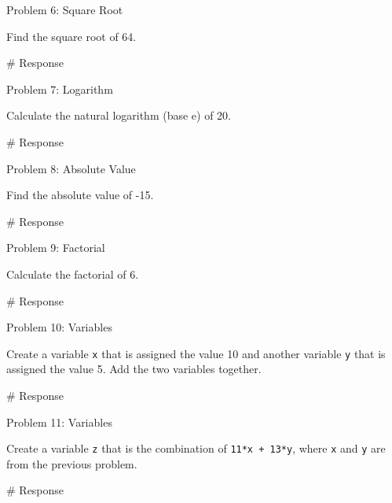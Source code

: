 \documentclass[
  letterpaper,
  DIV=11,
  numbers=noendperiod]{scrreprt}
\newenvironment{Shaded}{\begin{snugshade}}{\end{snugshade}}
\newcommand{\CommentTok}[1]{\textcolor[rgb]{0.37,0.37,0.37}{#1}}
\begin{document}
Problem 6: Square Root

Find the square root of 64.

\begin{Shaded}
\begin{Highlighting}[]
\CommentTok{\# Response}
\end{Highlighting}
\end{Shaded}

Problem 7: Logarithm

Calculate the natural logarithm (base e) of 20.

\begin{Shaded}
\begin{Highlighting}[]
\CommentTok{\# Response}
\end{Highlighting}
\end{Shaded}

Problem 8: Absolute Value

Find the absolute value of -15.

\begin{Shaded}
\begin{Highlighting}[]
\CommentTok{\# Response}
\end{Highlighting}
\end{Shaded}

Problem 9: Factorial

Calculate the factorial of 6.

\begin{Shaded}
\begin{Highlighting}[]
\CommentTok{\# Response}
\end{Highlighting}
\end{Shaded}

Problem 10: Variables

Create a variable \texttt{x} that is assigned the value 10 and another
variable \texttt{y} that is assigned the value 5. Add the two variables
together.

\begin{Shaded}
\begin{Highlighting}[]
\CommentTok{\# Response}
\end{Highlighting}
\end{Shaded}

Problem 11: Variables

Create a variable \texttt{z} that is the combination of
\texttt{11*x\ +\ 13*y}, where \texttt{x} and \texttt{y} are from the
previous problem.

\begin{Shaded}
\begin{Highlighting}[]
\CommentTok{\# Response}
\end{Highlighting}
\end{Shaded}
\end{document}
